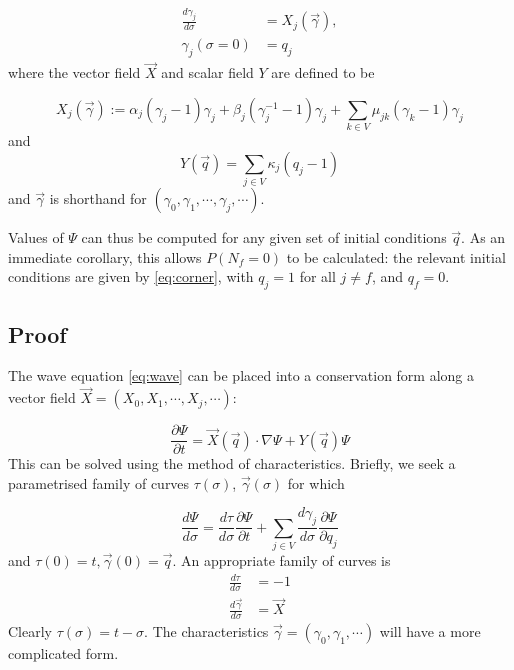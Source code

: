 \documentclass{article}
\begin{document}
\begin{align}
    \frac{d {\gamma}_j}{d \sigma} &= {X}_j(\vec{\gamma}),
    \nonumber \\
    {\gamma}_j(\sigma = 0) &= {q}_j
    \label{eq:ivp}
\end{align}
where the vector field $\vec{X}$ and scalar field $Y$ are defined to be

\begin{equation*}
    X_j(\vec{\gamma}) :=
    \alpha_j (\gamma_j - 1) \gamma_j
    + \beta_j (\gamma_j^{-1} - 1) \gamma_j
    + \sum_{k \in V} \mu_{jk} (\gamma_k - 1) \gamma_j
\end{equation*}
and
\begin{equation*}
    Y(\vec{q}) = \sum_{j \in V}\kappa_j (q_j - 1)
\end{equation*}
and $\vec{\gamma}$ is shorthand for $(\gamma_0, \gamma_1, \cdots, \gamma_j,
\cdots)$.

Values of $\Psi$ can thus be computed for any given set of initial conditions
$\vec{q}$. As an immediate corollary, this allows $P(N_f = 0)$ to be calculated:
the relevant initial conditions are given by \eqref{eq:corner}, with $q_j = 1$
for all $j\neq f$, and $q_f = 0$.

\subsection*{Proof}

The wave equation \eqref{eq:wave} can be placed into a conservation form along a vector field
$\vec{X} = (X_0,X_1,\cdots,X_j,\cdots)$:

\begin{equation}
    \frac{\partial \Psi}{\partial t} = \vec{X}(\vec{q}) \cdot \nabla \Psi + Y(\vec{q}) \Psi
    \label{eq:wave2}
\end{equation}
This can be solved using the method of characteristics. Briefly, we seek a
parametrised family of curves $\tau(\sigma)$, $\vec{\gamma}(\sigma)$ for which

\begin{equation}
    \frac{d \Psi}{d \sigma} = \frac{d \tau}{d \sigma} \frac{\partial \Psi}{\partial t} 
    + \sum_{j \in V} \frac{d \gamma_j}{d \sigma} \frac{\partial \Psi}{\partial q_j}
\end{equation}
and $\tau(0) = t,\vec{\gamma}(0) = \vec{q}$. An appropriate family of curves is
\begin{align}
    \frac{d \tau}{d \sigma} &= -1
    \nonumber \\
    \frac{d \vec{\gamma}}{d \sigma} &= \vec{X}
    \nonumber
\end{align}
Clearly $\tau(\sigma) = t - \sigma$. The characteristics
$\vec{\gamma}=(\gamma_0,\gamma_1,\cdots)$ will have a more complicated form.
\end{document}
